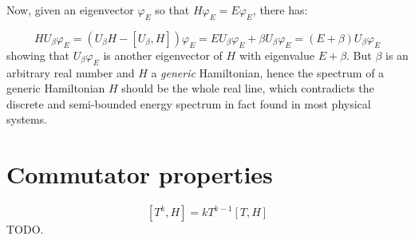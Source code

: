 \documentclass[a4paper,12pt]{article}
\begin{document}
Now, given an eigenvector $\varphi_{E}$ so that $H\varphi_{E}=E\varphi_{E}$, there has:

$$
HU_{\beta}\varphi_{E} = (U_{\beta}H - [U_{\beta}, H])\varphi_{E} =
EU_{\beta}\varphi_{E} + \beta U_{\beta}\varphi_{E} = (E+\beta)U_{\beta}\varphi_{E}
$$
showing that $U_{\beta}\varphi_{E}$ is another eigenvector of $H$ with eigenvalue
$E+\beta$. But $\beta$ is an arbitrary real number and $H$ a \emph{generic} Hamiltonian,
hence the spectrum of a generic Hamiltonian $H$ should
be the whole real line, which contradicts the discrete and semi-bounded energy spectrum
in fact found in most physical systems.

\appendix\section{Commutator properties}\label{CommProp}
$$
[T^k, H] = kT^{k-1}[T, H]
$$
TODO.




\end{document}
